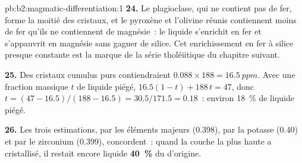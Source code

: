 \begin{solution}{pb:b2:magmatic-differentiation:1}
\textbf{24.} Le plagioclase, qui ne contient pas de fer, forme la moitié des cristaux, et le
pyroxène et l'olivine réunis contiennent moins de fer qu'ils ne contiennent de magnésie~: le liquide
s'enrichit en fer et s'appauvrit en magnésie sans gagner de silice. Cet enrichissement en fer
à silice presque constante est la marque de la série tholéiitique du
chapitre suivant.

\textbf{25.} Des cristaux cumulus purs contiendraient $0.088\times188 = \qty{16.5}{ppm}$. Avec une
fraction massique $t$ de liquide piégé, $16.5(1 - t) + 188\,t = 47$, donc $t = (47 -
16.5)/(188 - 16.5) = 30.5/171.5 = 0.18$~: environ \qty{18}{\percent} de liquide piégé.

\textbf{26.} Les trois estimations, par les éléments majeurs (0.398), par la
potasse (0.40) et par le zirconium (0.399), concordent~: quand la couche la
plus haute a cristallisé, il restait encore liquide
\textbf{\qty[text-series-to-math=true]{40}{\percent}} du  d'origine.
\end{solution}
